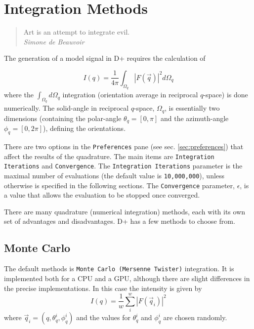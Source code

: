 \documentclass[../D+Manual.tex]{subfiles}
\begin{document}
\chapter{Integration Methods} \label{chp:integrationMethods}

\begin{quote}
	Art is an attempt to integrate evil.\\
	\hspace*{\fill} \textit{Simone de Beauvoir}
\end{quote}


The generation of a model signal in D+ requires the calculation of

\begin{equation}
I\left(q\right) = \frac{1}{4\pi}\int_{\Omega_q}\left|F\left(\vec q\right)\right|^2 d\Omega_q
\label{eq:OE}
\end{equation}
where the $\int_{\Omega_q}d\Omega_q$ integration (orientation average in reciprocal $q$-space) is done numerically. The solid-angle in reciprocal $q$-space, $\Omega_q$, is essentially two dimensions (containing the polar-angle $\theta_q = \left[0,\pi\right]$ and the azimuth-angle $\phi_q = \left[0,2\pi\right]$), defining the orientations.

There are two options in the \texttt{Preferences} pane (see sec. \ref{sec:preferences}) that affect the results of the quadrature. The main items are \texttt{Integration Iterations} and \texttt{Convergence}. The  \texttt{Integration Iterations} parameter is the maximal number of evaluations (the default value is \texttt{10,000,000}), unless otherwise is specified in the following sections. The \texttt{Convergence} parameter, $\epsilon$, is a value that allows the evaluation to be stopped once converged.

There are many quadrature (numerical integration) methods, each with its own set of advantages and disadvantages. D+ has a few methods to choose from.

\section{Monte Carlo}

The default methods is \texttt{Monte Carlo (Mersenne Twister)} integration. It is implemented both for a CPU and a GPU, although there are slight differences in the precise implementations. In this case the intensity is given by
\begin{equation}
I\left(q\right) = \frac{1}{w}\sum_{i}^{w}\left|F\left(\vec{q}_i\right)\right|^2
\label{equ:OrientAvr}
\end{equation}
where $\vec{q}_{i}=\left(q, \theta_{q}^{i},\phi_{q}^{i}\right)$ and the values for $\theta_{q}^{i}$ and $\phi_{q}^{i}$ are chosen randomly. 
\end{document}
